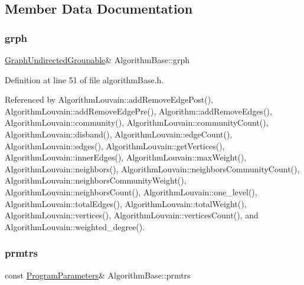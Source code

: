 \subsection{Member Data Documentation}
\mbox{\label{classAlgorithmBase_a54b71b720b025291d9802e20874c860d}} 
\subsubsection{\texorpdfstring{grph}{grph}}
{\footnotesize\ttfamily \hyperlink{classGraphUndirectedGroupable}{Graph\+Undirected\+Groupable}\& Algorithm\+Base\+::grph\hspace{0.3cm}{\ttfamily [protected]}}



Definition at line 51 of file algorithm\+Base.\+h.



Referenced by Algorithm\+Louvain\+::add\+Remove\+Edge\+Post(), Algorithm\+Louvain\+::add\+Remove\+Edge\+Pre(), Algorithm\+::add\+Remove\+Edges(), Algorithm\+Louvain\+::community(), Algorithm\+Louvain\+::community\+Count(), Algorithm\+Louvain\+::disband(), Algorithm\+Louvain\+::edge\+Count(), Algorithm\+Louvain\+::edges(), Algorithm\+Louvain\+::get\+Vertices(), Algorithm\+Louvain\+::inner\+Edges(), Algorithm\+Louvain\+::max\+Weight(), Algorithm\+Louvain\+::neighbors(), Algorithm\+Louvain\+::neighbors\+Community\+Count(), Algorithm\+Louvain\+::neighbors\+Community\+Weight(), Algorithm\+Louvain\+::neighbors\+Count(), Algorithm\+Louvain\+::one\+\_\+level(), Algorithm\+Louvain\+::total\+Edges(), Algorithm\+Louvain\+::total\+Weight(), Algorithm\+Louvain\+::vertices(), Algorithm\+Louvain\+::vertices\+Count(), and Algorithm\+Louvain\+::weighted\+\_\+degree().

\mbox{\label{classAlgorithmBase_a69765034d365e4cab46c25ec626db528}} 
\subsubsection{\texorpdfstring{prmtrs}{prmtrs}}
{\footnotesize\ttfamily const \hyperlink{structProgramParameters}{Program\+Parameters}\& Algorithm\+Base\+::prmtrs\hspace{0.3cm}{\ttfamily [protected]}}



